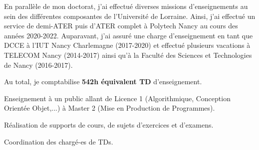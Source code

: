 
\begin{cvparagraph}
    En parallèle de mon doctorat, j'ai effectué diverses missions d'enseignements au sein des différentes composantes de l'Université de Lorraine.
    Ainsi, j'ai effectué un service de demi-ATER puis d'ATER complet à Polytech Nancy au cours des années 2020-2022.
    Auparavant, j'ai assuré une charge d'enseignement en tant que DCCE à l'IUT Nancy Charlemagne (2017-2020) et effectué plusieurs vacations à TELECOM Nancy (2014-2017) ainsi qu'à la Faculté des Sciences et Technologies de Nancy (2016-2017).

    Au total, je comptabilise \textbf{542h équivalent TD} d'enseignement.

    \bigskip

    \begin{cvitems} %
        \item Enseignement à un public allant de Licence 1 (Algorithmique, Conception Orientée Objet,...) à Master 2 (Mise en Production de Programmes).
        \item Réalisation de supports de cours, de sujets d'exercices et d'examens.
        \item Coordination des chargé-es de TDs.
    \end{cvitems}
\end{cvparagraph}
